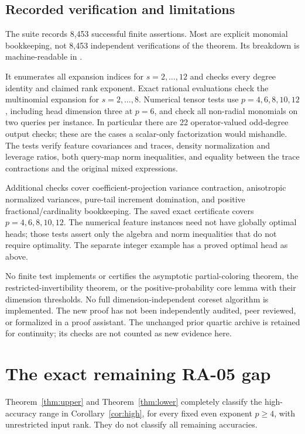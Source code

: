 \documentclass[11pt]{article}
\theoremstyle{remark}\newtheorem{remark}[theorem]{Remark}
\begin{document}
\subsection{Recorded verification and limitations}
The suite records 8,453 successful finite assertions. Most are explicit monomial bookkeeping, not 8,453 independent verifications of the theorem. Its breakdown is machine-readable in .

It enumerates all expansion indices for $s=2,\ldots,12$ and checks every degree identity and claimed rank exponent. Exact rational evaluations check the multinomial expansion for $s=2,\ldots,8$. Numerical tensor tests use $p=4,6,8,10,12$, including head dimension three at $p=6$, and check all non-radial monomials on two queries per instance. In particular there are 22 operator-valued odd-degree output checks; these are the cases a scalar-only factorization would mishandle. The tests verify feature covariances and traces, density normalization and leverage ratios, both query-map norm inequalities, and equality between the trace contractions and the original mixed expressions.

Additional checks cover coefficient-projection variance contraction, anisotropic normalized variances, pure-tail increment domination, and positive fractional/cardinality bookkeeping. The saved exact certificate covers $p=4,6,8,10,12$. The numerical feature instances need not have globally optimal heads; those tests assert only the algebra and norm inequalities that do not require optimality. The separate integer example has a proved optimal head as above.

No finite test implements or certifies the asymptotic partial-coloring theorem, the restricted-invertibility theorem, or the positive-probability core lemma with their dimension thresholds. No full dimension-independent coreset algorithm is implemented. The new proof has not been independently audited, peer reviewed, or formalized in a proof assistant. The unchanged prior quartic archive is retained for continuity; its checks are not counted as new evidence here.

\section{The exact remaining RA-05 gap}\label{sec:gap}
Theorem~\ref{thm:upper} and Theorem~\ref{thm:lower} completely classify the high-accuracy range in Corollary~\ref{cor:high}, for every fixed even exponent $p\ge4$, with unrestricted input rank. They do not classify all remaining accuracies.
\end{document}

